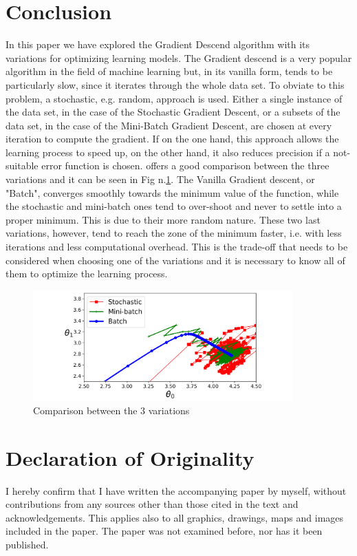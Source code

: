 \documentclass[conference]{IEEEtran}
\begin{document}
\section{Conclusion}

In this paper we have explored the Gradient Descend algorithm with its variations for optimizing learning models. The Gradient descend is a very popular algorithm in the field of machine learning but, in its vanilla form, tends to be particularly slow, since it iterates through the whole data set. To obviate to this problem, a stochastic, e.g. random, approach is used. Either a single instance of the data set, in the case of the Stochastic Gradient Descent, or a subsets of the data set, in the case of the Mini-Batch Gradient Descent, are chosen at every iteration to compute the gradient. If on the one hand, this approach allows the learning process to speed up, on the other hand, it also reduces precision if a not-suitable error function is chosen. 
\cite{Scikit-Learn} offers a good comparison between the three variations and it can be seen in Fig n.\ref{fig:comparison}.
The Vanilla Gradient descent, or "Batch", converges smoothly towards the minimum value of the function, while the stochastic and mini-batch ones tend to over-shoot and never to settle into a proper minimum. This is due to their more random nature. These two last variations, however,  tend to reach the zone of the minimum faster, i.e. with less iterations and less computational overhead. 
This is the trade-off that needs to be considered when choosing one of the variations and it is necessary to know all of them to optimize the learning process. 
\begin{figure}[htbp]
    \includegraphics[width = 10cm]{Schermata 2021-05-11 alle 16.26.13.png}
    \caption{Comparison between the 3 variations}
    \label{fig:comparison}
\end{figure}

\newpage

\section{Declaration of Originality}
I hereby confirm that I have written the accompanying paper by myself, without contributions from any sources other than those cited in the text and acknowledgements.
This applies also to all graphics, drawings, maps and images included in the paper.
The paper was not examined before, nor has it been published.


 
\end{document}
